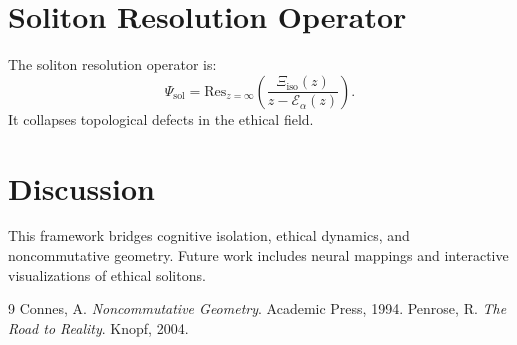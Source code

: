 \documentclass[12pt]{article}
\theoremstyle{plain}
\theoremstyle{definition}
\theoremstyle{remark}
\newcommand{\Eth}{\mathcal{E}_\alpha}
\newcommand{\Xiso}{\Xi_{\text{iso}}}
\newcommand{\Psisol}{\Psi_{\text{sol}}}
\begin{document}
\section{Soliton Resolution Operator}
The soliton resolution operator is:
\[
\Psisol = \text{Res}_{z=\infty} \left( \frac{\Xiso(z)}{z - \Eth(z)} \right).
\]
It collapses topological defects in the ethical field.

\section{Discussion}
This framework bridges cognitive isolation, ethical dynamics, and noncommutative geometry. Future work includes neural mappings and interactive visualizations of ethical solitons.


\begin{thebibliography}{9}
 Connes, A. \emph{Noncommutative Geometry}. Academic Press, 1994.
 Penrose, R. \emph{The Road to Reality}. Knopf, 2004.
\end{thebibliography}
\end{document}
